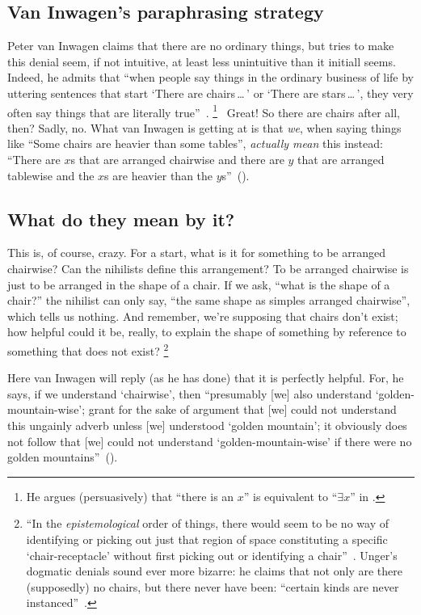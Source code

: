 \documentclass[11pt]{article}
\begin{document}
\begin{spacing}{1.5}
\section{Van Inwagen's paraphrasing strategy}
\label{pigletwise}
Peter van Inwagen claims that there are no ordinary things, but tries to make this denial seem, if not intuitive, at least less unintuitive than it initiall seems. Indeed, he admits that ``when people say things in the ordinary business of life by uttering sentences that start `There are chairs\,\ldots\,' or `There are stars\,\ldots\,', they very often say things that are literally true''~\cite[102]{inwagen1995}.%
%
\footnote{He argues (persuasively) that ``there is an $x$'' is equivalent to ``$\exists x$'' in \citet{inwagen1998}.}%
%
\ Great! So there are chairs after all, then? Sadly, no. What van Inwagen is getting at is that {\em we}, when saying things like ``Some chairs are heavier than some tables'', {\em actually mean} this instead: ``There are $x$s that are arranged chairwise and there are $y$ that are arranged tablewise and the $x$s are heavier than the $y$s''~(\citeyear[109]{inwagen1995}).

\subsection{What do they mean by it?}
This is, of course, crazy. For a start, what is it for something to be arranged chairwise? Can the nihilists define this arrangement? To be arranged chairwise is just to be arranged in the shape of a chair. If we ask, ``what is the shape of a chair?'' the nihilist can only say, ``the same shape as simples arranged chairwise'', which tells us nothing. And remember, we're supposing that chairs don't exist; how helpful could it be, really, to explain the shape of something by reference to something that does not exist?%
%
\footnote{``In the {\em epistemological} order of things, there would seem to be no way of identifying or picking out just that region of space constituting a specific `chair-receptacle' without first picking out or identifying a chair''~\citep[702]{rosenberg1993}. Unger's dogmatic denials sound ever more bizarre: he claims that not only are there (supposedly) no chairs, but there never have been: ``certain kinds are never instanced''~\citep[147]{unger1979}.}%
%

Here van Inwagen will reply (as he has done) that it is perfectly helpful. For, he says, if we understand `chairwise', then ``presumably [we] also understand `golden-mountain-wise'; grant for the sake of argument that [we] could not understand this ungainly adverb unless [we] understood `golden mountain'; it obviously does not follow that [we] could not understand `golden-mountain-wise' if there were no golden mountains''~(\citeyear[719]{inwagen1993b}).


\end{spacing}
\end{document}

